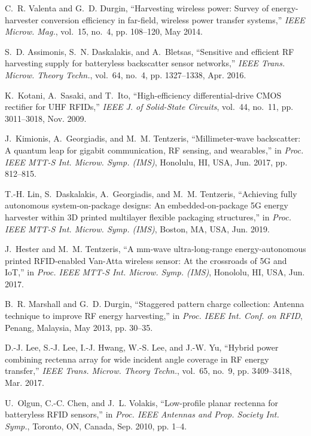 \documentclass[journal]{IEEEtran}
\begin{document}
\begin{thebibliography}{10}
C.~R. Valenta and G.~D. Durgin, ``Harvesting wireless power: Survey of
  energy-harvester conversion efficiency in far-field, wireless power transfer
  systems,'' \emph{{IEEE} Microw. Mag.}, vol.~15, no.~4, pp. 108--120, May
  2014.

S.~D. Assimonis, S.~N. Daskalakis, and A.~Bletsas, ``Sensitive and efficient
  {RF} harvesting supply for batteryless backscatter sensor networks,''
  \emph{{IEEE} Trans. Microw. Theory Techn.}, vol.~64, no.~4, pp. 1327--1338,
  Apr. 2016.

K.~Kotani, A.~Sasaki, and T.~Ito, ``High-efficiency differential-drive {CMOS}
  rectifier for {UHF RFID}s,'' \emph{{IEEE} J. of Solid-State Circuits},
  vol.~44, no.~11, pp. 3011--3018, Nov. 2009.

J.~Kimionis, A.~Georgiadis, and M.~M. Tentzeris, ``Millimeter-wave backscatter:
  A quantum leap for gigabit communication, {RF} sensing, and wearables,'' in
  \emph{Proc. {IEEE} MTT-S Int. Microw. Symp. (IMS)}, Honolulu, HI, USA, Jun.
  2017, pp. 812--815.

T.-H. Lin, S.~Daskalakis, A.~Georgiadis, and M.~M. Tentzeris, ``Achieving fully
  autonomous system-on-package designs: An embedded-on-package {5G} energy
  harvester within {3D} printed multilayer flexible packaging structures,'' in
  \emph{Proc. {IEEE} MTT-S Int. Microw. Symp. (IMS)}, Boston, MA, USA, Jun.
  2019.

J.~Hester and M.~M. Tentzeris, ``A mm-wave ultra-long-range energy-autonomous
  printed {RFID}-enabled {V}an-{A}tta wireless sensor: At the crossroads of
  {5G} and {I}o{T},'' in \emph{Proc. {IEEE} MTT-S Int. Microw. Symp. (IMS)},
  Honololu, HI, USA, Jun. 2017.

B.~R. Marshall and G.~D. Durgin, ``Staggered pattern charge collection: Antenna
  technique to improve {RF} energy harvesting,'' in \emph{Proc. {IEEE} Int.
  Conf. on RFID}, Penang, Malaysia, May 2013, pp. 30--35.

D.-J. Lee, S.-J. Lee, I.-J. Hwang, W.-S. Lee, and J.-W. Yu, ``Hybrid power
  combining rectenna array for wide incident angle coverage in {RF} energy
  transfer,'' \emph{{IEEE} Trans. Microw. Theory Techn.}, vol.~65, no.~9, pp.
  3409--3418, Mar. 2017.

U.~Olgun, C.-C. Chen, and J.~L. Volakis, ``Low-profile planar rectenna for
  batteryless {RFID} sensors,'' in \emph{Proc. {IEEE} Antennas and Prop.
  Society Int. Symp.}, Toronto, ON, Canada, Sep. 2010, pp. 1--4.


\end{thebibliography}
\end{document}
